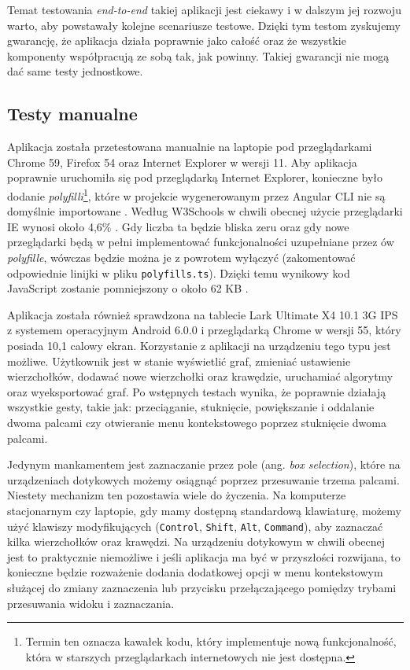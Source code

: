 Temat testowania \textit{end-to-end} takiej aplikacji jest ciekawy i w dalszym jej rozwoju warto, aby powstawały kolejne scenariusze testowe. Dzięki tym testom zyskujemy gwarancję, że aplikacja działa poprawnie jako całość oraz że wszystkie komponenty współpracują ze sobą tak, jak powinny. Takiej gwarancji nie mogą dać same testy jednostkowe. 

\subsection*{Testy manualne}

Aplikacja została przetestowana manualnie na laptopie pod przeglądarkami Chrome 59, Firefox 54 oraz Internet Explorer w wersji 11. Aby aplikacja poprawnie uruchomiła się pod przeglądarką Internet Explorer, konieczne było dodanie \textit{polyfilli}\footnote{Termin ten oznacza kawałek kodu, który implementuje nową funkcjonalność, która w starszych przeglądarkach internetowych nie jest dostępna.}, które w projekcie wygenerowanym przez Angular CLI nie są domyślnie importowane \cite{duveau}. Według W3Schools w chwili obecnej użycie przeglądarki IE wynosi około 4,6\% \cite{w3schools}. Gdy liczba ta będzie bliska zeru oraz gdy nowe przeglądarki będą w pełni implementować funkcjonalności uzupełniane przez ów \textit{polyfille}, wówczas będzie można je z powrotem wyłączyć (zakomentować odpowiednie linijki w pliku \texttt{polyfills.ts}). Dzięki temu wynikowy kod JavaScript zostanie pomniejszony o około 62 KB \cite{angular-browser-support}. 

Aplikacja została również sprawdzona na tablecie Lark Ultimate X4 10.1 3G IPS z systemem operacyjnym Android 6.0.0 i przeglądarką Chrome w wersji 55, który posiada 10,1 calowy ekran. Korzystanie z aplikacji na urządzeniu tego typu jest możliwe. Użytkownik jest w stanie wyświetlić graf, zmieniać ustawienie wierzchołków, dodawać nowe wierzchołki oraz krawędzie, uruchamiać algorytmy oraz wyeksportować graf. Po wstępnych testach wynika, że poprawnie działają wszystkie gesty, takie jak: przeciąganie, stuknięcie, powiększanie i oddalanie dwoma palcami czy otwieranie menu kontekstowego poprzez stuknięcie dwoma palcami. 

Jedynym mankamentem jest zaznaczanie przez pole (ang. \textit{box selection}), które na urządzeniach dotykowych możemy osiągnąć poprzez przesuwanie trzema palcami. Niestety mechanizm ten pozostawia wiele do życzenia. Na komputerze stacjonarnym czy laptopie, gdy mamy dostępną standardową klawiaturę, możemy użyć klawiszy modyfikujących (\texttt{Control}, \texttt{Shift}, \texttt{Alt}, \texttt{Command}), aby zaznaczać kilka wierzchołków oraz krawędzi. Na urządzeniu dotykowym w chwili obecnej jest to praktycznie niemożliwe i jeśli aplikacja ma być w przyszłości rozwijana, to konieczne będzie rozważenie dodania dodatkowej opcji w menu kontekstowym służącej do zmiany zaznaczenia lub przycisku przełączającego pomiędzy trybami przesuwania widoku i zaznaczania. 

